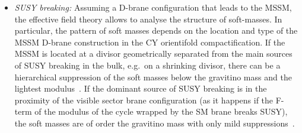 \documentclass[11pt,a4paper]{article}
\begin{document}
\begin{itemize}
\item {\it SUSY breaking:} Assuming a D-brane configuration that leads to the MSSM,
the effective field theory allows to analyse the structure of soft-masses.
In particular, the pattern of soft masses depends on the location and type of the MSSM D-brane construction
in the CY orientifold compactification.
If the MSSM is located at a divisor geometrically separated from the main sources of SUSY breaking in the bulk,
e.g.~on a shrinking divisor, there can be a hierarchical suppression of the soft masses below the gravitino mass and the lightest modulus~\cite{Blumenhagen:2009gk}. If the dominant source of SUSY breaking is in the proximity of the visible sector brane configuration
(as it happens if the F-term of the modulus of the cycle wrapped by the SM brane breaks SUSY),
the soft masses are of order the gravitino mass with only mild suppressions~\cite{Conlon:2005ki, Conlon:2010ji,Choi:2010gm,Shin:2011uk}.
\end{itemize}
\end{document}
